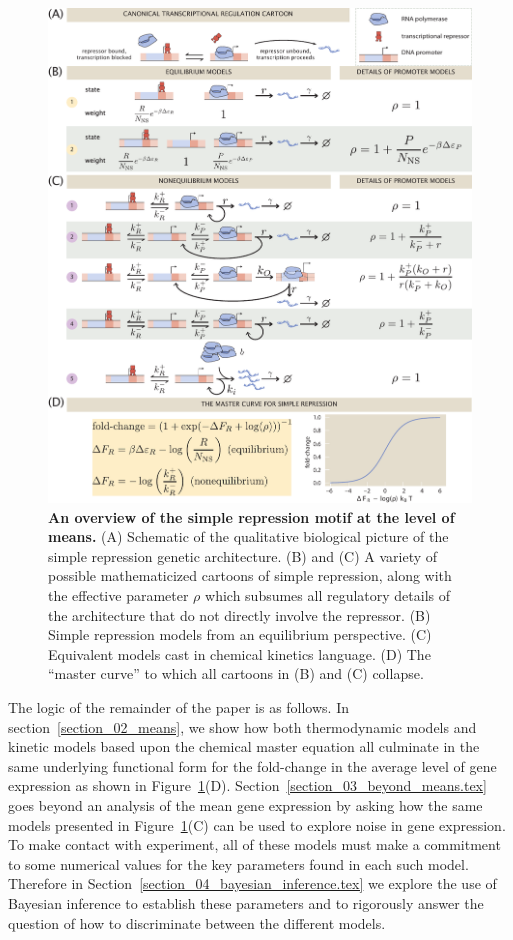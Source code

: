 \afterpage{\clearpage}
\begin{figure}[p]
\centering
\includegraphics[width=\textwidth]{../figures/main/fig01.pdf}
\caption{\textbf{An overview of the simple repression motif at the level of
means.} (A) Schematic of the qualitative biological picture of the simple
repression genetic architecture. (B) and (C) A variety of possible
mathematicized cartoons of simple repression, along with the effective parameter
$\rho$ which subsumes all regulatory details of the architecture that do not
directly involve the repressor. (B) Simple repression models from an equilibrium
perspective. (C) Equivalent models cast in chemical kinetics language. (D) The
``master curve'' to which all cartoons in (B) and (C) collapse.}
\label{fig1:means_cartoons}
\end{figure}

The logic of the remainder of the paper is as follows. In
section~\ref{section_02_means}, we show how both thermodynamic models and
kinetic models based upon the chemical master equation all culminate in the same
underlying functional form for the fold-change in the average level of gene
expression as shown in Figure~\ref{fig1:means_cartoons}(D).
Section~\ref{section_03_beyond_means.tex} goes beyond an analysis of the mean
gene expression by asking how the same models presented in
Figure~\ref{fig1:means_cartoons}(C) can be used to explore noise in gene
expression. To make contact with experiment, all of these models must make a
commitment to some numerical values for the key parameters found in each such
model. Therefore in Section~\ref{section_04_bayesian_inference.tex} we explore
the use of Bayesian inference to establish these parameters and to rigorously
answer the question of how to discriminate between the different models.

